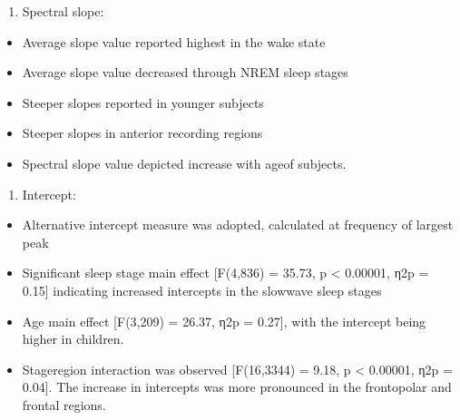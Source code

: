 \documentclass[letterpaper,10pt,english]{sphinxmanual}
\begin{document}
\sphinxAtStartPar
{}
\begin{enumerate}
%
\item {} 
\sphinxAtStartPar
Spectral slope:

\end{enumerate}
\begin{itemize}
\item {} 
\sphinxAtStartPar
Average slope value reported highest in the wake state

\item {} 
\sphinxAtStartPar
Average slope value decreased through NREM sleep stages

\item {} 
\sphinxAtStartPar
Steeper slopes reported in younger subjects

\item {} 
\sphinxAtStartPar
Steeper slopes in anterior recording regions

\item {} 
\sphinxAtStartPar
Spectral slope value depicted increase with ageof subjects.

\end{itemize}


\sphinxAtStartPar
{}
\begin{enumerate}
%
\setcounter{enumi}{1}
\item {} 
\sphinxAtStartPar
Intercept:

\end{enumerate}
\begin{itemize}
\item {} 
\sphinxAtStartPar
Alternative intercept measure was adopted, calculated at frequency of largest peak

\item {} 
\sphinxAtStartPar
Significant sleep stage main effect {[}F(4,836) = 35.73, p \textless{} 0.00001, η2p = 0.15{]} indicating increased intercepts in the slow\sphinxhyphen{}wave sleep stages

\item {} 
\sphinxAtStartPar
Age main effect {[}F(3,209) = 26.37, η2p = 0.27{]}, with the intercept being higher in children.

\item {} 
\sphinxAtStartPar
Stage\sphinxhyphen{}region interaction was observed {[}F(16,3344) = 9.18, p \textless{} 0.00001, η2p = 0.04{]}. The increase in intercepts was more pronounced in the frontopolar and frontal regions.

\end{itemize}
\end{document}
